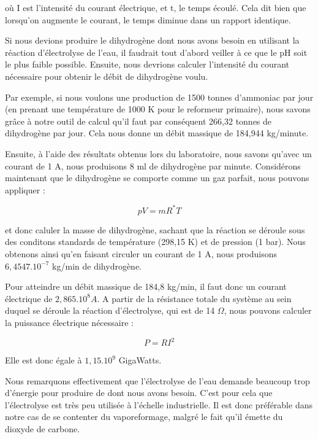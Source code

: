 \documentclass[a4paper, oneside, 12pt]{article}
\begin{document}
où I est l'intensité du courant électrique, et t, le temps écoulé. Cela dit bien que lorsqu'on augmente le courant, le temps diminue dans un rapport identique.

Si nous devions produire le dihydrogène dont nous avons besoin en utilisant la réaction d'électrolyse de l'eau, il faudrait tout d'abord veiller à ce que le pH soit le plus faible possible. Ensuite, nous devrions calculer l'intensité du courant nécessaire pour obtenir le débit de dihydrogène voulu.

Par exemple, si nous voulons une production de 1500 tonnes d'ammoniac par jour (en prenant une température de 1000 K pour le reformeur primaire), nous savons grâce à notre outil de calcul qu'il faut par conséquent 266,32 tonnes de dihydrogène par jour. Cela nous donne un débit massique de 184,944 kg/minute.

Ensuite, à l'aide des résultats obtenus lors du laboratoire, nous savons qu'avec un courant de 1 A, nous produisons 8 ml de dihydrogène par minute. Considérons maintenant que le dihydrogène se comporte comme un gaz parfait, nous pouvons appliquer :

\begin{equation*}
	pV = mR^{*}T
\end{equation*}

et donc caluler la masse de dihydrogène, sachant que la réaction se déroule sous des conditons standards de température (298,15 K) et de pression (1 bar). Nous obtenons ainsi qu'en faisant circuler un courant de 1 A, nous produisons $6,4547.10^{-7}$ kg/min de dihydrogène.

Pour atteindre un débit massique de 184,8 kg/min, il faut donc un courant électrique de $2,865.10^8 A$. A partir de la résistance totale du système au sein duquel se déroule la réaction d'électrolyse, qui est de 14 $\Omega$, nous pouvons calculer la puissance électrique nécessaire : 

\begin{equation*}
	P = RI^{2}
\end{equation*}

Elle est donc égale à $1,15.10^{9}$ GigaWatts.

Nous remarquons effectivement que l'électrolyse de l'eau demande beaucoup trop d'énergie pour produire de dont nous avons besoin. C'est pour cela que l'électrolyse est très peu utilisée à l'échelle industrielle. Il est donc préférable dans notre cas de se contenter du vaporeformage, malgré le fait qu'il émette du dioxyde de carbone.
\end{document}
